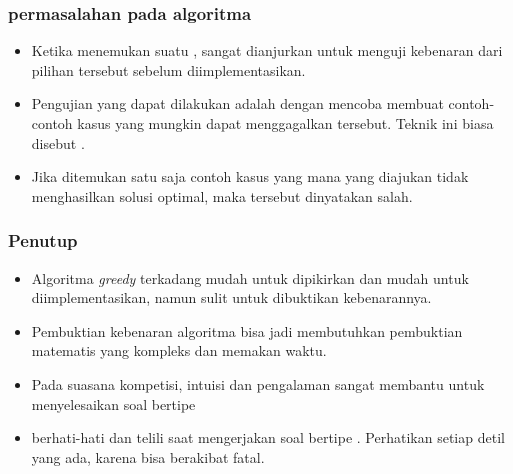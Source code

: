 \begin{frame}
	\frametitle{permasalahan pada algoritma }
	\begin{itemize}
		\item Ketika menemukan suatu , sangat dianjurkan untuk menguji kebenaran dari pilihan tersebut sebelum diimplementasikan.
		\item Pengujian yang dapat dilakukan adalah dengan mencoba membuat contoh-contoh kasus yang mungkin dapat menggagalkan  tersebut. Teknik ini biasa disebut .
		\item Jika ditemukan satu saja contoh kasus yang mana  yang diajukan tidak menghasilkan solusi optimal, maka  tersebut dinyatakan salah.
	\end{itemize}
\end{frame}

\begin{frame}
\frametitle{Penutup}
\begin{itemize}
		\item Algoritma \textit{greedy} terkadang mudah untuk dipikirkan dan mudah untuk diimplementasikan, namun sulit untuk dibuktikan kebenarannya.
		\item Pembuktian kebenaran algoritma  bisa jadi membutuhkan pembuktian matematis yang kompleks dan memakan waktu. 
		\item Pada suasana kompetisi, intuisi dan pengalaman sangat membantu untuk menyelesaikan soal bertipe 
		\item  berhati-hati dan telili saat mengerjakan soal bertipe . Perhatikan setiap detil yang ada, karena  bisa berakibat fatal.
		
\end{itemize}
\end{frame}


